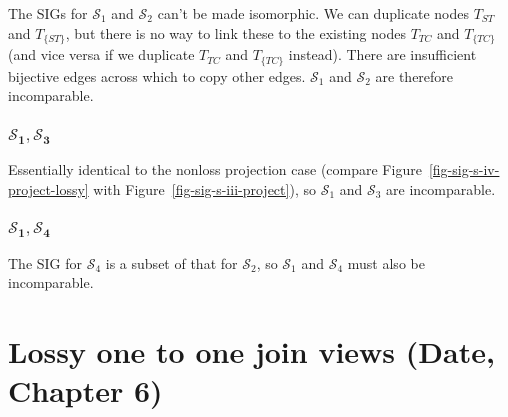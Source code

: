 \documentclass{article}
\newcommand{\identifier}[1]{\ensuremath{\mathit{#1}}}
\newcommand{\ST}{\identifier{ST}}
\newcommand{\TC}{\identifier{TC}}
\newcommand{\Type}[1]{\ensuremath{T_{#1}}}
\newcommand{\TT}[1]{\ensuremath{T_{\{#1\}}}}
\newcommand{\schema}[1]{\ensuremath{\mathcal{S}_{#1}}}
\begin{document}
\noindent The SIGs for \(\schema{1}\) and \(\schema{2}\) can't be made isomorphic. We can duplicate nodes \(\Type{\ST}\) and \(\TT{\ST}\), but there is no way to link these to the existing nodes \(\Type{\TC}\) and \(\TT{\TC}\) (and vice versa if we duplicate \(\Type{\TC}\) and \(\TT{\TC}\) instead). There are insufficient bijective edges across which to copy other edges. \(\schema{1}\) and \(\schema{2}\) are therefore incomparable.




\subsubsection{\(\bm{\schema{1}, \schema{3}}\)}

Essentially identical to the nonloss projection case (compare Figure~\ref{fig-sig-s-iv-project-lossy} with Figure~\ref{fig-sig-s-iii-project}), so \(\schema{1}\) and \(\schema{3}\) are incomparable.




\subsubsection{\(\bm{\schema{1}, \schema{4}}\)}

The SIG for \(\schema{4}\) is a subset of that for \(\schema{2}\), so \(\schema{1}\) and \(\schema{4}\) must also be incomparable.




\newpage

\section{Lossy one to one join views (Date, Chapter 6)}
\label{sec-one-to-one-join}


\end{document}
